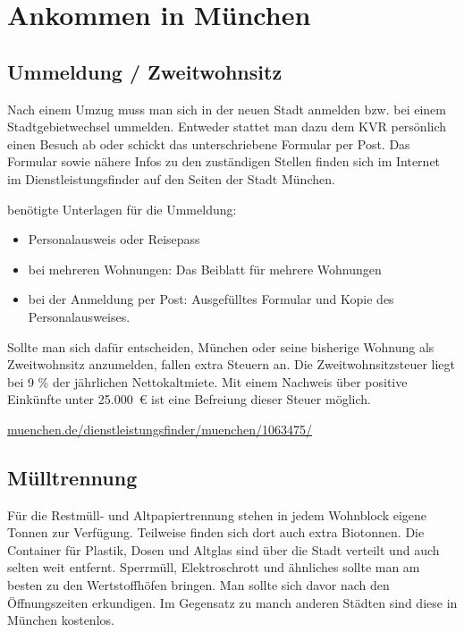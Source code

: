 ﻿
\chapter{Ankommen in München}

\section{Ummeldung / Zweitwohnsitz}

Nach einem Umzug muss man sich in der neuen Stadt anmelden bzw. bei einem Stadtgebietwechsel ummelden. Entweder stattet man dazu dem KVR persönlich einen Besuch ab oder schickt das unterschriebene Formular per Post. Das Formular sowie nähere Infos zu den zuständigen Stellen finden sich im Internet im Dienstleistungsfinder auf den Seiten der Stadt München.

benötigte Unterlagen für die Ummeldung: %
\begin{itemize}
	\item Personalausweis oder Reisepass
	\item bei mehreren Wohnungen: Das Beiblatt für mehrere Wohnungen
	\item bei der Anmeldung per Post: Ausgefülltes Formular und Kopie des Personalausweises.
\end{itemize}

Sollte man sich dafür entscheiden, München oder seine bisherige Wohnung als Zweitwohnsitz anzumelden, fallen extra Steuern an. Die Zweitwohnsitzsteuer liegt bei 9 \% der jährlichen Nettokaltmiete. Mit einem Nachweis über positive Einkünfte unter 25.000~€ ist eine Befreiung dieser Steuer möglich.

\begin{urlList}
	\item \url{muenchen.de/dienstleistungsfinder/muenchen/1063475/}
\end{urlList}

\section{Mülltrennung}

Für die Restmüll- und Altpapiertrennung stehen in jedem Wohnblock eigene Tonnen zur Verfügung. Teilweise finden sich dort auch extra Biotonnen.
Die Container für Plastik, Dosen und Altglas sind über die Stadt verteilt und auch selten weit entfernt.
Sperrmüll, Elektroschrott und ähnliches sollte man am besten zu den Wertstoffhöfen bringen. Man sollte sich davor nach den Öffnungszeiten erkundigen. Im Gegensatz zu manch anderen Städten sind diese in München kostenlos.

